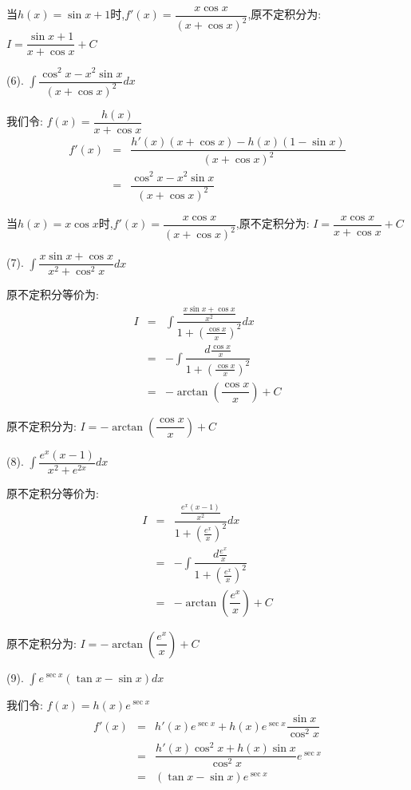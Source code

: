\begin{anymark}[积分训练]
\begin{solution}
		当$h(x)=\sin x+1$时,$f'(x)=\dfrac{x\cos x}{(x+\cos x)^2}$,原不定积分为:  $I=\dfrac{\sin x+1}{x+\cos x}+C$
	\end{solution}
	(6). $\int \dfrac{\cos^2x-x^2\sin x}{(x+\cos x)^2}dx$
	\begin{solution}
		
		我们令:  $f(x)=\dfrac{h(x)}{x+\cos x}$
		\begin{eqnarray*}
			f'(x)&=&\dfrac{h'(x)(x+\cos x)-h(x)(1-\sin x)}{(x+\cos x)^2}\\
			&=&\dfrac{\cos^2x-x^2\sin x}{(x+\cos x)^2}
		\end{eqnarray*}
		
		当$h(x)=x\cos x$时,$f'(x)=\dfrac{x\cos x}{(x+\cos x)^2}$,原不定积分为:  $I=\dfrac{x\cos x}{x+\cos x}+C$
	\end{solution}
	(7). $\int \dfrac{x\sin x+\cos x}{x^2+\cos^2x}dx$
	\begin{solution}
		
		原不定积分等价为:  
		\begin{eqnarray*}
			I&=&\int \dfrac{\frac{x\sin x+\cos x}{x^2}}{1+\left( \frac{\cos x}{x}\right)^2}dx\\
			&=&-\int \dfrac{d\frac{\cos x}{x}}{1+\left( \frac{\cos x}{x}\right)^2}\\
			&=&-\arctan(\dfrac{\cos x}{x})+C
		\end{eqnarray*}
	
		原不定积分为:  $I=-\arctan(\dfrac{\cos x}{x})+C$
	\end{solution}
	(8). $\int \dfrac{e^x(x-1)}{x^2+e^{2x}}dx$
	\begin{solution}
		
		原不定积分等价为:  
		\begin{eqnarray*}
			I&=&\dfrac{\frac{e^x(x-1)}{x^2}}{1+\left(\frac{e^x}{x}\right)^2}dx\\
			&=&-\int \dfrac{d\frac{e^x}{x}}{1+\left( \frac{e^x}{x}\right)^2}\\
			&=&-\arctan(\dfrac{e^x}{x})+C
		\end{eqnarray*}
		
		原不定积分为:  $I=-\arctan(\dfrac{e^x}{x})+C$
	\end{solution}
	(9). $\int e^{\sec x}(\tan x-\sin x)dx$
	\begin{solution}
		
		我们令:  $f(x)=h(x)e^{\sec x}$
		\begin{eqnarray*}
			f'(x)&=&h'(x)e^{\sec x}+h(x)e^{\sec x}\dfrac{\sin x}{\cos^2x}\\
			&=&\dfrac{h'(x)\cos^2x+h(x)\sin x}{\cos^2x}e^{\sec x}\\
			&=&(\tan x-\sin x)e^{\sec x}
		\end{eqnarray*}
		

\end{solution}
\end{anymark}
